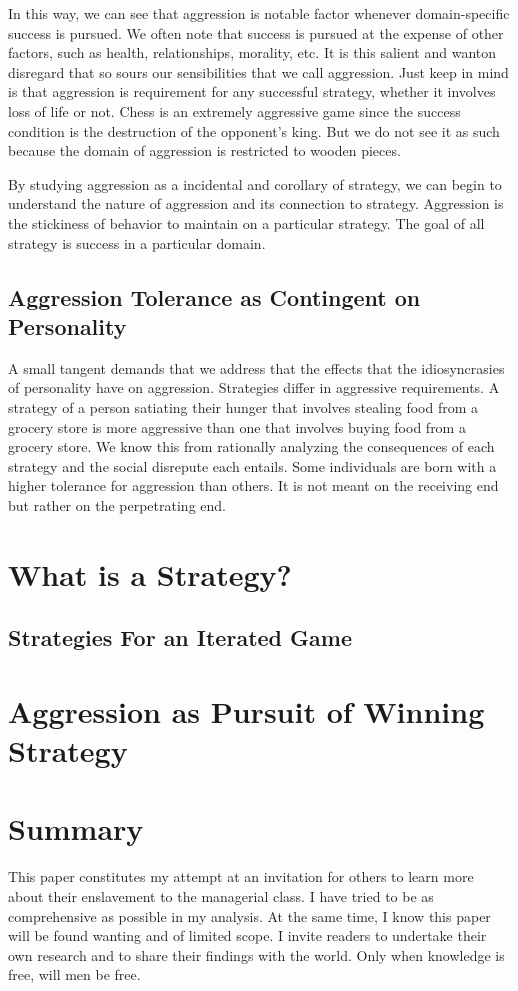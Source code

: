 \documentclass[12pt]{article}
\begin{document}
In this way, we can see that aggression is notable factor whenever domain-specific success is pursued.
We often note that success is pursued at the expense of other factors, such as health, relationships, morality, etc.
It is this salient and wanton disregard that so sours our sensibilities that we call aggression.
Just keep in mind is that aggression is requirement for any successful strategy, whether it involves loss of life or not.
Chess is an extremely aggressive game since the success condition is the destruction of the opponent's king.
But we do not see it as such because the domain of aggression is restricted to wooden pieces.

By studying aggression as a incidental and corollary of strategy, we can begin to understand the nature of aggression and its connection to strategy.
Aggression is the stickiness of behavior to maintain on a particular strategy.
The goal of all strategy is success in a particular domain.

\subsection{Aggression Tolerance as Contingent on Personality}
A small tangent demands that we address that the effects that the idiosyncrasies of personality have on aggression.
Strategies differ in aggressive requirements.
A strategy of a person satiating their hunger that involves stealing food from a grocery store is more aggressive than one that involves buying food from a grocery store.
We know this from rationally analyzing the consequences of each strategy and the social disrepute each entails.
Some individuals are born with a higher tolerance for aggression than others.
It is not meant on the receiving end but rather on the perpetrating end.

\section{What is a Strategy?}
\subsection{Strategies For an Iterated Game}

\section{Aggression as Pursuit of Winning Strategy}

\section{Summary}
This paper constitutes my attempt at an invitation for others to learn more about their enslavement to the managerial class.
I have tried to be as comprehensive as possible in my analysis.
At the same time, I know this paper will be found wanting and of limited scope.
I invite readers to undertake their own research and to share their findings with the world.
Only when knowledge is free, will men be free.
\end{document}
